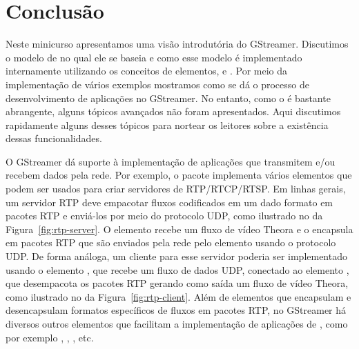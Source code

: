 \section{Conclusão}
\label{sec:conclusao}
Neste minicurso apresentamos uma visão introdutória do  GStreamer. 
Discutimos o modelo de  no qual ele se baseia e como esse modelo
é implementado internamente utilizando os conceitos de elementos,  e 
. Por meio da implementação de vários exemplos mostramos como
se dá o processo de desenvolvimento de aplicações no GStreamer. No entanto,
como o  é bastante abrangente, alguns tópicos avançados não
foram apresentados. Aqui discutimos rapidamente alguns desses tópicos 
para nortear os leitores sobre a existência dessas funcionalidades. 

O GStreamer dá suporte à implementação de aplicações que transmitem e/ou
recebem dados pela rede. Por exemplo, o pacote  implementa
vários elementos que podem ser usados para criar servidores de 
RTP/RTCP/RTSP. Em linhas gerais, um servidor RTP deve empacotar fluxos
codificados em um dado formato em pacotes RTP e enviá-los por meio do 
protocolo UDP, como ilustrado no  da Figura~\ref{fig:rtp-server}.
O elemento  recebe um fluxo de vídeo Theora e o encapsula
em pacotes RTP que são enviados pela rede pelo elemento  usando
o protocolo UDP. De forma análoga, um cliente para esse servidor poderia ser 
implementado usando o elemento , que recebe um fluxo de dados UDP,
conectado ao elemento , que desempacota os pacotes RTP gerando
como saída um fluxo de vídeo Theora, como ilustrado no  da
Figura~\ref{fig:rtp-client}. Além de elementos que encapsulam e desencapsulam 
formatos específicos de fluxos em pacotes RTP, no GStreamer há diversos outros 
elementos que facilitam a implementação de aplicações de , como
por exemplo , , , etc.

